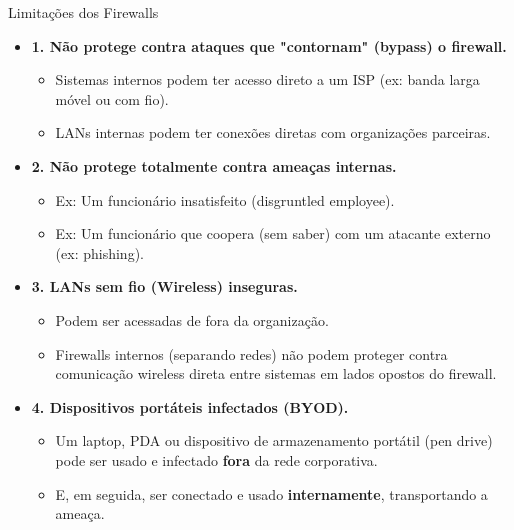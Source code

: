 \begin{frame}{Limitações dos Firewalls}
    \begin{itemize}
        \item \textbf{1. Não protege contra ataques que "contornam" (bypass) o firewall.}
              \begin{itemize}
                  \item Sistemas internos podem ter acesso direto a um ISP (ex: banda larga móvel ou com fio).
                  \item LANs internas podem ter conexões diretas com organizações parceiras.
              \end{itemize}

        \item \textbf{2. Não protege totalmente contra ameaças internas.}
              \begin{itemize}
                  \item Ex: Um funcionário insatisfeito (disgruntled employee).
                  \item Ex: Um funcionário que coopera (sem saber) com um atacante externo (ex: phishing).
              \end{itemize}

        \item \textbf{3. LANs sem fio (Wireless) inseguras.}
              \begin{itemize}
                  \item Podem ser acessadas de fora da organização.
                  \item Firewalls internos (separando redes) não podem proteger contra comunicação wireless direta entre sistemas em lados opostos do firewall.
              \end{itemize}

        \item \textbf{4. Dispositivos portáteis infectados (BYOD).}
              \begin{itemize}
                  \item Um laptop, PDA ou dispositivo de armazenamento portátil (pen drive) pode ser usado e infectado \textbf{fora} da rede corporativa.
                  \item E, em seguida, ser conectado e usado \textbf{internamente}, transportando a ameaça.
              \end{itemize}
    \end{itemize}
\end{frame}

